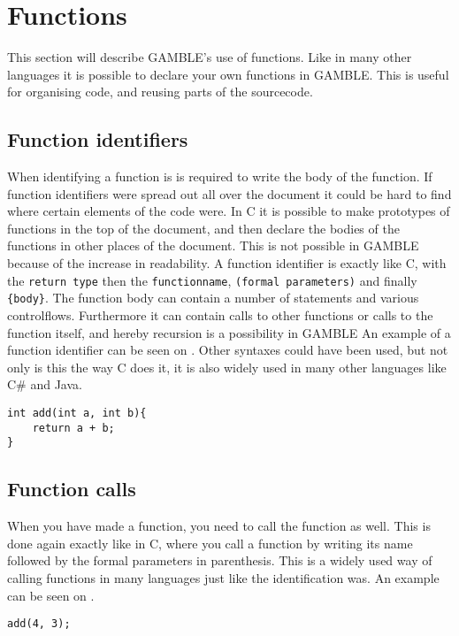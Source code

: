 \section{Functions}
This section will describe GAMBLE's use of functions. 
Like in many other languages it is possible to declare your own functions in GAMBLE.
This is useful for organising code, and reusing parts of the sourcecode.

\subsection{Function identifiers}
When identifying a function is is required to write the body of the function.
If function identifiers were spread out all over the document it could be hard to find where certain elements of the code were.
In C it is possible to make prototypes of functions in the top of the document, and then declare the bodies of the functions in other places of the document. 
This is not possible in GAMBLE because of the increase in readability.
A function identifier is exactly like C, with the \texttt{return type} then the \texttt{functionname}, \texttt{(formal parameters)} and finally \texttt{\{body\}}.
The function body can contain a number of statements and various controlflows.
Furthermore it can contain calls to other functions or calls to the function itself, and hereby recursion is a possibility in GAMBLE
An example of a function identifier can be seen on .
Other syntaxes could have been used, but not only is this the way C does it, it is also widely used in many other languages like C\# and Java.

\begin{lstlisting}[label=functionID]                                                                           %LOL%
int add(int a, int b){
	return a + b;
}
\end{lstlisting}

\subsection{Function calls}
When you have made a function, you need to call the function as well.
This is done again exactly like in C, where you call a function by writing its name followed by the formal parameters in parenthesis.
This is a widely used way of calling functions in many languages just like the identification was.
An example can be seen on .

\begin{lstlisting}[label=functionCall]
add(4, 3);
\end{lstlisting}


